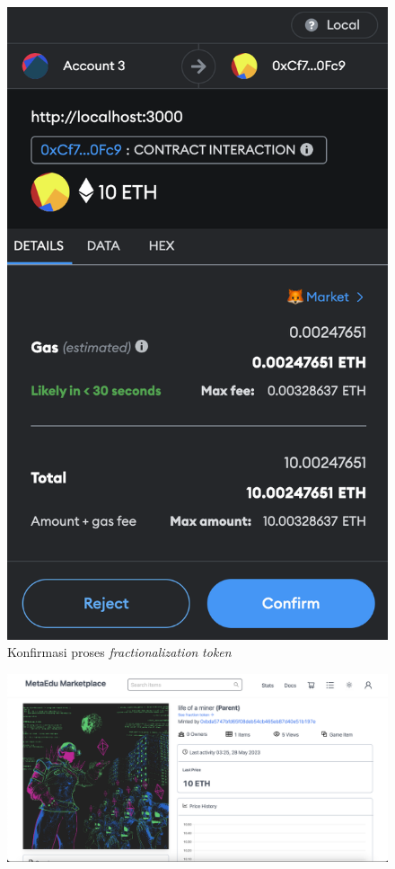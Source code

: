 \begin{itemize}
\begin{figure} [H]
            \includegraphics[scale=0.4]{gambar/img-test-share-rent-2.png}
            \caption{Konfirmasi proses \emph{fractionalization} \emph{token}}
            \label{fig:TestShareFractionalizationToken}
        \end{figure}
        \begin{figure} [H] \centering
            \includegraphics[scale=0.3]{gambar/img-test-share-fraction-3.png}

\end{figure}
\end{itemize}
